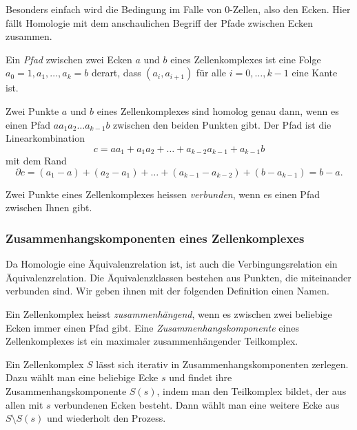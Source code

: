 Besonders einfach wird die Bedingung im Falle von $0$-Zellen, also
den Ecken.
Hier fällt Homologie mit dem anschaulichen Begriff der Pfade zwischen
Ecken zusammen.

\begin{definition}[Pfad]
Ein \emph{Pfad} zwischen zwei Ecken $a$ und $b$ eines Zellenkomplexes
ist eine Folge $a_0=1,a_1,\dots,a_k=b$ derart, dass $(a_i,a_{i+1})$
für alle $i=0,\dots,k-1$ eine Kante ist.
\end{definition}

Zwei Punkte $a$ und $b$ eines Zellenkomplexes sind homolog
genau dann, wenn es einen Pfad $aa_1a_2\dots a_{k-1}b$ zwischen
den beiden Punkten gibt.
Der Pfad ist die Linearkombination
\[
c = aa_1 + a_1a_2 + \dots + a_{k-2}a_{k-1} + a_{k-1}b
\]
mit dem Rand
\[
\partial c
=
(a_1 - a) + (a_2-a_1) + \dots + (a_{k-1}-a_{k-2}) + (b-a_{k-1})
=
b-a.
\]

\begin{definition}
Zwei Punkte eines Zellenkomplexes heissen \emph{verbunden},
wenn es einen Pfad zwischen Ihnen gibt.
\end{definition}

%
%
\subsubsection{Zusammenhangskomponenten eines Zellenkomplexes}
Da Homologie eine Äquivalenzrelation ist, ist auch die Verbingungsrelation
ein Äquivalenzrelation.
Die Äquivalenzklassen bestehen aus Punkten, die miteinander verbunden
sind.
Wir geben ihnen mit der folgenden Definition einen Namen.

\begin{definition}[Zusammenhang]
Ein Zellenkomplex heisst \emph{zusammenhängend}, wenn es zwischen
%
zwei beliebige Ecken immer einen Pfad gibt.
Eine \emph{Zusammenhangskomponente} eines Zellenkomplexes ist ein
%
maximaler zusammenhängender Teilkomplex.
\end{definition}

Ein Zellenkomplex $S$ lässt sich iterativ in Zusammenhangskomponenten
zerlegen.
Dazu wählt man eine beliebige Ecke $s$ und findet ihre
Zusammenhangskomponente $S(s)$, indem man den Teilkomplex bildet,
der aus allen mit $s$ verbundenen Ecken besteht.
Dann wählt man eine weitere Ecke aus $S\setminus S(s)$ und wiederholt
den Prozess.

%
%
